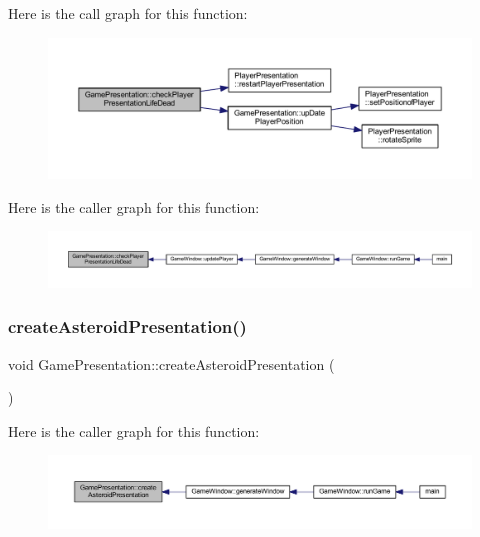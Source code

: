 Here is the call graph for this function\+:\nopagebreak
\begin{figure}[H]
\begin{center}
\leavevmode
\includegraphics[width=350pt]{class_game_presentation_a027b38ee9bf11018b4db7494d2e145a0_cgraph}
\end{center}
\end{figure}
Here is the caller graph for this function\+:\nopagebreak
\begin{figure}[H]
\begin{center}
\leavevmode
\includegraphics[width=350pt]{class_game_presentation_a027b38ee9bf11018b4db7494d2e145a0_icgraph}
\end{center}
\end{figure}
\mbox{\label{class_game_presentation_a4c3e9bf3b8866eaff58c5eb8c83f3245}} 
\subsubsection{\texorpdfstring{create\+Asteroid\+Presentation()}{createAsteroidPresentation()}}
{\footnotesize\ttfamily void Game\+Presentation\+::create\+Asteroid\+Presentation (\begin{DoxyParamCaption}{ }\end{DoxyParamCaption})}

Here is the caller graph for this function\+:\nopagebreak
\begin{figure}[H]
\begin{center}
\leavevmode
\includegraphics[width=350pt]{class_game_presentation_a4c3e9bf3b8866eaff58c5eb8c83f3245_icgraph}
\end{center}
\end{figure}
\mbox{\label{class_game_presentation_a59645176840f6ddec2673b9d447334d5}} 
